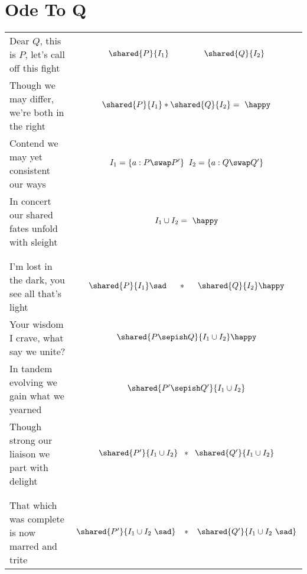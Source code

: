 \clearpage\section{Ode To Q}
\begin{tabular}{l @{} c}
Dear $Q$, this is $P$, let's call off this fight
& $\shared{P}{I_1} \hspace*{1.5cm} \shared{Q}{I_2}$\vspace*{2pt}\\

Though we may differ, we're both in the right &$\shared{P}{I_1} * \shared{Q}{I_2} =\ \happy $\vspace*{2pt}
\\

Contend we may yet consistent our ways 
&$I_1 = \{a : P \swap P'\} \;\; I_2 = \{a: Q \swap Q'\}$\vspace*{2pt}\\

In concert our shared fates unfold with sleight&
 $I_1 \cup I_2 =\ \happy$ \\\\\\


I'm lost in the dark, you see all that's light
&$\shared{P}{I_1} \sad \hspace*{0.5cm} * \hspace*{0.5cm}  \shared{Q}{I_2} \happy$\vspace*{2pt}\\

Your wisdom I crave, what say we unite? 
&$\shared{P \sepish Q}{I_1 \cup I_2} \happy$\vspace*{2pt}\\

In tandem evolving we gain what we yearned 
&$\shared{P' \sepish Q'}{I_1 \cup I_2} $\vspace*{2pt}\\

Though strong our liaison we part with delight
&$\shared{P'}{I_1 \cup I_2} \;\; *\;\;  \shared{Q'}{I_1 \cup I_2} $\\\\\\


That which was complete is now marred and trite
& $\shared{P'}{I_1 \cup I_2\ \sad}  \;\;\; * \;\;\;  \shared{Q'}{I_1 \cup I_2\ \sad} $\vspace*{2pt}\\


\end{tabular}

